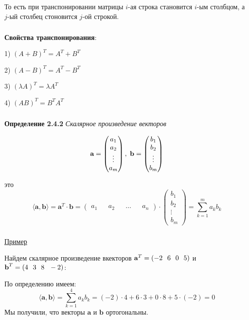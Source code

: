 \documentclass[12pt,a4paper]{article}
\begin{document}
То есть при транспонировании матрицы $i$-ая строка становится $i$-ым столбцом, а $j$-ый столбец 
стоновится $j$-ой строкой.

\subparagraph{}
\textbf{Свойства транспонирования}:

1) $(A + B)^T = A^T + B^T$

2) $(A - B)^T = A^T - B^T$

3) $(\lambda A)^T = \lambda A^T$

4) $(AB)^T = B^TA^T$
 
\subparagraph{}
\textbf{Определение 2.4.2} 
\textit{Скалярное произведение векторов} 

\[
\textbf{a} = \begin{pmatrix}
a_1 \\
a_2 \\
\vdots \\
a_m
\end{pmatrix}, \hspace{3px} \textbf{b} = \begin{pmatrix}
b_1 \\
b_2 \\
\vdots \\
b_m
\end{pmatrix}
\]

это
\[\langle \textbf{a}, \textbf{b} \rangle = \textbf{a}^T \cdot \textbf{b} = \begin{pmatrix}
a_1 && a_2 && \ldots && a_n
\end{pmatrix} \cdot \begin{pmatrix}
b_1 \\
b_2 \\
\vdots \\
b_m
\end{pmatrix} = \sum_{k=1}^m a_{k} b_{k}\]

\subparagraph{}
\underline{Пример}

Найдем скалярное произведение вкекторов $\textbf{a}^T = (-2 \hspace{7px} 6 \hspace{7px} 0 \hspace{7px} 5)$ и $\textbf{b}^T = (4 \hspace{7px} 3 \hspace{7px} 8 \hspace{7px} -2)$:

По определению имеем:
\[\langle \textbf{a}, \textbf{b} \rangle = \sum_{k=1}^4 a_{k} b_{k} = (-2) \cdot 4 + 6 \cdot 3 + 0 \cdot 8 + 5 \cdot (-2) = 0\]
Мы получили, что векторы $\textbf{a}$ и $\textbf{b}$ ортогональны.
\end{document}
